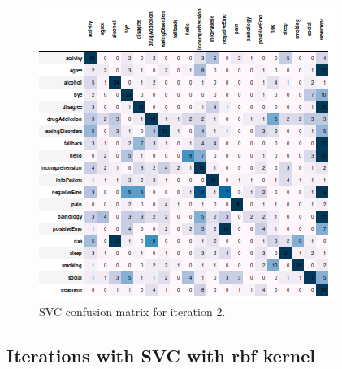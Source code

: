 \documentclass[11pt]{article}
\begin{document}
\begin{figure}[h]
	\centering
	\includegraphics[scale=0.7]{lsvc_2.png}
	\caption{SVC confusion matrix for iteration 2.}
\label{lsvc_cm_2}
\end{figure}
\FloatBarrier



\subsection{Iterations with SVC with rbf kernel}
\end{document}
